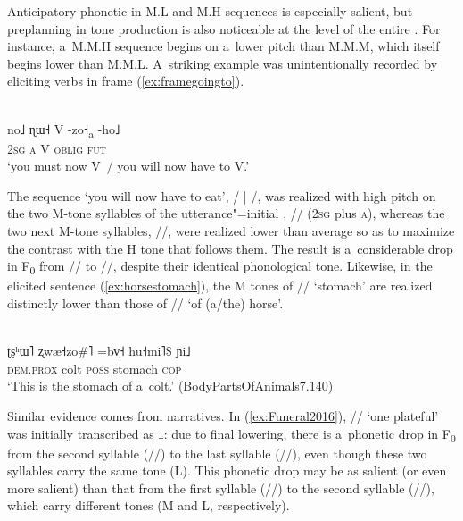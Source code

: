 Anticipatory phonetic  in M.L and M.H sequences is especially salient, but
preplanning in tone production is also noticeable at the level of the entire . For
instance, a~M.M.H sequence begins on a~lower pitch than M.M.M, which itself begins lower than M.M.L. A~striking example was
unintentionally recorded by eliciting verbs in frame (\ref{ex:framegoingto}).

\begin{exe}
	\ex
	\label{ex:framegoingto}
	\\ 
	\gll no˩	ɳɯ˧	V	-zo˧\textsubscript{a}	-ho˩\\
	\textsc{2sg}		\textsc{a}	V	\textsc{oblig}	\textsc{fut}\\
	\glt ‘you must now V~/ you will now have to V.’
\end{exe}

The sequence ‘you will now have to eat’, / {\kern2pt}|{\kern2pt}
/, was realized with high pitch on the two M-tone syllables of the
utterance"=initial , // (2\textsc{sg} plus \textsc{a}), whereas the two next M-tone syllables,
//, were realized lower than average so as to maximize the contrast with the H tone
that follows them. The result is a~considerable drop in F\textsubscript{0}
from // to //, despite their identical phonological tone. Likewise, in the
elicited sentence (\ref{ex:horsestomach}), the M tones of // ‘stomach’ are realized
distinctly lower than those of // ‘of \mbox{(a/the)} horse’.

\begin{exe}
	\ex
	\label{ex:horsestomach}
	\\ 
	\gll ʈʂʰɯ˥		ʐwæ˧zo\#˥	=bv̩˧	hu˧mi˥\$	ɲi˩\\
	\textsc{dem.prox}	colt	\textsc{poss}		stomach		\textsc{cop}\\
	\glt ‘This is the stomach
	of a~colt.’ (BodyPartsOfAnimals7.140)
\end{exe}

Similar evidence comes from narratives. In (\ref{ex:Funeral2016}), // ‘one plateful’ was initially transcribed as $\ddagger${\kern2pt}: due to final lowering, there is a~phonetic drop in F\textsubscript{0} from the second syllable (//) to the last syllable (//), even though these two syllables carry the same tone (L). This phonetic drop may be as
salient (or even more salient) than that from the first syllable (//) to the second syllable (//), which carry different tones (M and L, respectively).

